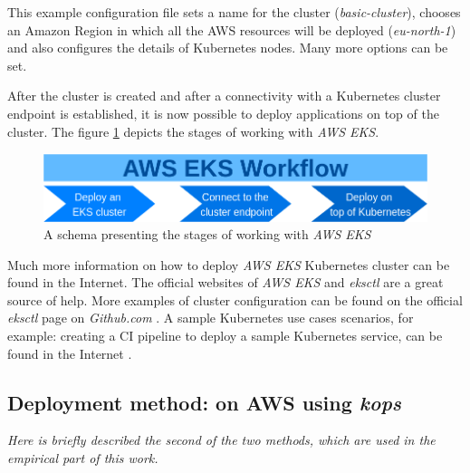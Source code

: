 This example configuration file sets a name for the cluster (\textit{basic-cluster}), chooses an Amazon Region in which all the AWS resources will be deployed (\textit{eu-north-1}) and also configures the details of Kubernetes nodes. Many more options can be set.

After the cluster is created and after a connectivity with a Kubernetes cluster endpoint is established, it is now possible to deploy applications on top of the cluster. The figure \ref{fig:eks-w} depicts the stages of working with \textit{AWS EKS}.
\begin{figure}[H]
    \centering
    \includegraphics[width=12cm]{figures/eks-workflow.png}
    \captionsetup{justification=centering,margin=2cm,width=1.2\linewidth}
    \caption{A schema presenting the stages of working with \textit{AWS EKS}}
    \label{fig:eks-w}
\end{figure}

Much more information on how to deploy \textit{AWS EKS} Kubernetes cluster can be found in the Internet. The official websites of \textit{AWS EKS} \cite{what-is-eks} and \textit{eksctl} \cite{eksctl} are a great source of help. More examples of cluster configuration can be found on the official \textit{eksctl} page on \textit{Github.com} \cite{eks-gh}. A sample Kubernetes use cases scenarios, for example: creating a CI pipeline to deploy a sample Kubernetes service, can be found in the Internet \cite{eksworkshop}.


\subsection{Deployment method: on AWS using \textit{kops}}
\textit{Here is briefly described the second of the two methods, which are used in the empirical part of this work.}
\\

